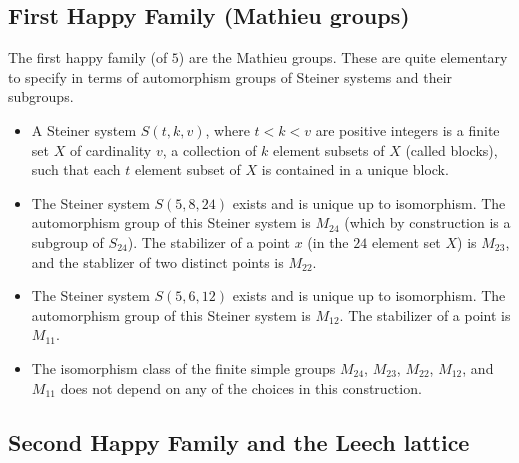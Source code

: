 \subsection{First Happy Family (Mathieu groups)} \label{section-mathieu}

The first happy family (of $5$) are the Mathieu groups.  These are quite
elementary to specify in terms of automorphism groups of Steiner
systems and their subgroups.

\begin{itemize}
\item A Steiner system $S(t,k,v)$, where $t < k < v$ are positive
  integers is a finite set $X$ of cardinality $v$, a collection of $k$
  element subsets of $X$ (called blocks), such that each $t$ element
  subset of $X$ is contained in a unique block.
\item The Steiner system $S(5,8,24)$ exists and is unique up to
  isomorphism.  The automorphism group of this Steiner system is
  $M_{24}$ (which by construction is a subgroup of $S_{24}$).  The
  stabilizer of a point $x$ (in the $24$ element set $X$) is $M_{23}$,
  and the stablizer of two distinct points is $M_{22}$.
\item The Steiner system $S(5,6,12)$ exists and is unique up to
  isomorphism.  The automorphism group of this Steiner system is
  $M_{12}$.  The stabilizer of a point is $M_{11}$.
\item The isomorphism class of the finite simple groups $M_{24}$,
  $M_{23}$, $M_{22}$, $M_{12}$, and $M_{11}$ does not depend on any of
  the choices in this construction.
\end{itemize}

\subsection{Second Happy Family and the Leech lattice} \label{section-second-happy-fam}

